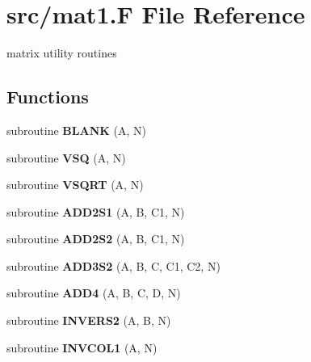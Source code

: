\hypertarget{mat1_8F}{
\section{src/mat1.F File Reference}
\label{mat1_8F}
}
matrix utility routines 

\subsection*{Functions}
\begin{CompactItemize}
\item 
\hypertarget{mat1_8F_e40e5719709c8c6396f2c4787242cea9}{
subroutine \textbf{BLANK} (A, N)}
\label{mat1_8F_e40e5719709c8c6396f2c4787242cea9}

\item 
\hypertarget{mat1_8F_d2115558f61fa7a3799793d53d898a21}{
subroutine \textbf{VSQ} (A, N)}
\label{mat1_8F_d2115558f61fa7a3799793d53d898a21}

\item 
\hypertarget{mat1_8F_e67c79368c33e779b99ba75352392431}{
subroutine \textbf{VSQRT} (A, N)}
\label{mat1_8F_e67c79368c33e779b99ba75352392431}

\item 
\hypertarget{mat1_8F_67a31ab1897909850d47fbd2807f07a9}{
subroutine \textbf{ADD2S1} (A, B, C1, N)}
\label{mat1_8F_67a31ab1897909850d47fbd2807f07a9}

\item 
\hypertarget{mat1_8F_c35bb6148fb4590bf588e5f31b61a27a}{
subroutine \textbf{ADD2S2} (A, B, C1, N)}
\label{mat1_8F_c35bb6148fb4590bf588e5f31b61a27a}

\item 
\hypertarget{mat1_8F_13f6c00d026b90daeb9f9762c2fcd5a5}{
subroutine \textbf{ADD3S2} (A, B, C, C1, C2, N)}
\label{mat1_8F_13f6c00d026b90daeb9f9762c2fcd5a5}

\item 
\hypertarget{mat1_8F_c02b5ed5e32cbdb5461b9cd559ed2b50}{
subroutine \textbf{ADD4} (A, B, C, D, N)}
\label{mat1_8F_c02b5ed5e32cbdb5461b9cd559ed2b50}

\item 
\hypertarget{mat1_8F_d31c0513fbc129385e403b1e74603672}{
subroutine \textbf{INVERS2} (A, B, N)}
\label{mat1_8F_d31c0513fbc129385e403b1e74603672}

\item 
\hypertarget{mat1_8F_2dcc2fbf14512554e2032e851aad7833}{
subroutine \textbf{INVCOL1} (A, N)}
\label{mat1_8F_2dcc2fbf14512554e2032e851aad7833}


\end{CompactItemize}
